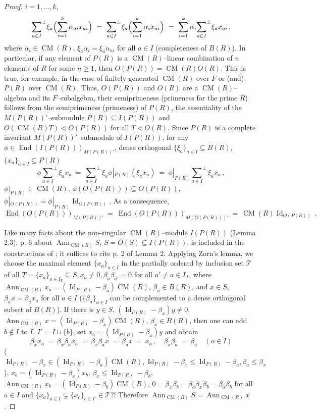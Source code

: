 \documentclass[a4paper,11pt]{article}
\DeclareMathOperator{\Id}{Id}
\DeclareMathOperator{\End}{End}
\DeclareMathOperator{\CM}{CM}
\DeclareMathOperator{\Ann}{Ann}
\begin{document}
\begin{proof}
${i=1, \ldots, k}$, 
\[
{\sum_{a\in I}}^{\perp} \xi_a 
\Bigl(\sum_{i=1}^k \alpha_{a i} x_{a i}\Bigr)\ =\ 
{\sum_{a\in I}}^{\perp} \xi_a \Bigl(\sum_{i=1}^k \alpha_i x_{a i}\Bigr)\ =\ 
\sum_{i=1}^k \alpha_i {\sum_{a\in I}}^{\perp} \xi_a x_{a i}\,,
\]
where ${\alpha_i\in \CM(R)}$, ${\xi_a \alpha_i=\xi_a \alpha_{a i}}$ for all 
${a\in I}$ (completeness of $B(R)$). In particular, if any element of $P(R)$ 
is a $\CM(R)$--linear combination of $n$ elements of $R$ for some ${n\geq 1}$, 
then ${O(P(R))=\CM(R) O(R)}$. This is true, for example, in the case of finitely 
generated $\CM(R)$ over $F$ or (and) $P(R)$ over $\CM(R)$. Thus, $O(P(R))$ and 
$O(R)$ are a $\CM(R)$--algebra and its $F$--subalgebra, their semiprimeness 
(primeness for the prime $R$) follows from the semiprimeness (primeness) of 
$P(R)$, the essentiality of the $M(P(R))'$--submodule 
${P(R)\subseteq I(P(R))}$ and\linebreak  
${O(\CM(R) T)\lhd O(P(R))}$ for all ${T\lhd O(R)}$. 
Since $P(R)$ is a complete invariant $M(P(R))'$--submodule of $I(P(R))$, 
for any ${\phi\in \End(I(P(R)))_{M(P(R))'}}$, dense orthogonal 
${\{\xi_a\}_{a\in I}\subseteq B(R)}$, ${\{x_a\}_{a\in I}\subseteq P(R)}$
\[
\phi {\sum\limits_{a\in I}}^{\perp} \xi_a x_a\ =\ 
{\sum\limits_{a\in I}}^{\perp} \xi_a \phi|_{P(R)}(\xi_a x_a)\ =\ 
\phi|_{P(R)} {\sum\limits_{a\in I}}^{\perp} \xi_a x_a\,,
\]
${\phi|_{P(R)}\in \CM(R)}$, ${\phi(O(P(R)))\subseteq O(P(R))}$, 
${\phi|_{O(P(R))}=\phi|_{P(R)} \Id_{O(P(R))}}$. As a consequence, 
\[
\End(O(P(R)))_{M(P(R))'}\ =\ \End(O(P(R)))_{M(O(P(R)))'}\ =\ 
\CM(R) \Id_{O(P(R))}\,.
\]

Like many facts about the non-singular $\CM(R)$--module $I(P(R))$ (Lemma 2.3), 
p. 6 about $\Ann_{\CM(R)} S$, ${S=O(S)\subseteq I(P(R))}$, is included in the 
constructions of \cite{B6}; it suffices to cite p. 2 of Lemma 2. Applying 
Zorn's lemma, we choose the maximal element $\{x_a\}_{a\in I}$ in the  
partially ordered by inclusion set $\mathcal{T}$ of all  
${T=\{x_a\}_{a\in I_T}\subseteq S, x_a\ne 0, \beta_a \beta_{a'}=0}$ for all 
${a'\ne a\in I_T}$, where ${\Ann_{\CM(R)} x_a=(\Id_{P(R)}-\beta_a) \CM(R)}$, 
${\beta_a\in B(R)}$, 
and ${x\in S}$, ${\beta_a x=\beta_a x_a}$ 
for all ${a\in I}$ ($\{\beta_a\}_{a\in I}$ can be complemented to a dense 
orthogonal subset of $B(R)$). If there is ${y\in S}$, 
${(\Id_{P(R)}-\beta_x) y\ne 0}$,  
${\Ann_{\CM(R)} x=(\Id_{P(R)}-\beta_x) \CM(R)}$, ${\beta_x\in B(R)}$, 
then one can add 
${b\notin I}$ to $I$, ${I'=I\cup \{b\}}$, set ${x_b=(\Id_{P(R)}-\beta_x) y}$ 
and obtain 
\[
\beta_x x_a\ =\ \beta_x \beta_a x_a\ =\ \beta_x \beta_a x\ =\ \beta_a x\ =\ 
x_a\,,\quad \beta_x \beta_a\ =\ \beta_a\quad (a\in I)
\]
(${\Id_{P(R)}-\beta_x\in (\Id_{P(R)}-\beta_a) \CM(R), 
\Id_{P(R)}-\beta_x\leq \Id_{P(R)}-\beta_a, \beta_a\leq \beta_x}$), 
${x_b=(\Id_{P(R)}-\beta_x) x_b}$, ${\beta_x\leq \Id_{P(R)}-\beta_b}$, 
${\Ann_{\CM(R)} x_b=(\Id_{P(R)}-\beta_b) \CM(R)}$, 
${0=\beta_x \beta_b=\beta_a \beta_x \beta_b=\beta_a \beta_b}$ for all 
${a\in I}$ and ${\{x_a\}_{a\in I}\subsetneq \{x_c\}_{c\in I'}\in \mathcal{T}}$?! Therefore 
${\Ann_{\CM(R)} S=\Ann_{\CM(R)} x}$. 
\end{proof}
\end{document}
